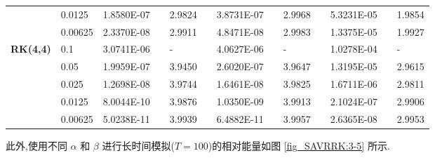 \begin{table}[H]
\begin{tabular}{lllllrlrlrlrlrl}
\multicolumn{2}{l}{} & \multicolumn{2}{l}{0.0125} & 1.8580E-07 &       & 2.9824  &       & 3.8731E-07 &       & 2.9968  &       & 5.3231E-05 &       & 1.9854  \\
\multicolumn{2}{l}{} & \multicolumn{2}{l}{0.00625} & 2.3370E-08 &       & 2.9911  &       & 4.8471E-08 &       & 2.9983  &       & 1.3375E-05 &       & 1.9927  \\
\multicolumn{2}{l}{\multirow{5}[1]{*}{\textbf{RK(4,4)}}} & \multicolumn{2}{l}{0.1} & 3.0741E-06 &       & -     &       & 4.0627E-06 &       & -     &       & 1.0278E-04 &       & - \\
\multicolumn{2}{l}{} & \multicolumn{2}{l}{0.05} & 1.9959E-07 &       & 3.9450  &       & 2.6020E-07 &       & 3.9647  &       & 1.3195E-05 &       & 2.9615  \\
\multicolumn{2}{l}{} & \multicolumn{2}{l}{0.025} & 1.2698E-08 &       & 3.9744  &       & 1.6461E-08 &       & 3.9825  &       & 1.6711E-06 &       & 2.9811  \\
\multicolumn{2}{l}{} & \multicolumn{2}{l}{0.0125} & 8.0044E-10 &       & 3.9876  &       & 1.0350E-09 &       & 3.9913  &       & 2.1024E-07 &       & 2.9906  \\
\multicolumn{2}{l}{} & \multicolumn{2}{l}{0.00625} & 5.0238E-11 &       & 3.9939  &       & 6.4882E-11 &       & 3.9957  &       & 2.6365E-08 &       & 2.9953  \\
\bottomrule
\end{tabular}%
\label{tab_SAVRRK:6-4}%
\end{table}%

此外,使用不同 $\alpha$ 和 $\beta$ 进行长时间模拟($T=100$)的相对能量如图 \ref{fig_SAVRRK:3-5} 所示.

